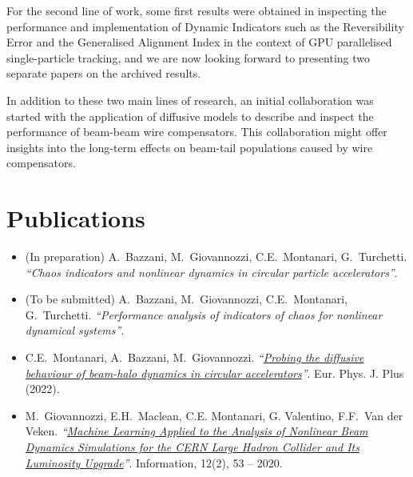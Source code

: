 For the second line of work, some first results were obtained in inspecting
the performance and implementation of Dynamic Indicators such as the
Reversibility Error and the Generalised Alignment Index in the context of GPU
parallelised single-particle tracking, and we are now looking forward to presenting
two separate papers on the archived results.

In addition to these two main lines of research, an initial collaboration was
started with the application of diffusive models to describe and inspect the
performance of beam-beam wire compensators. This collaboration might offer
insights into the long-term effects on beam-tail populations caused by wire
compensators.

\section*{Publications}

\begin{itemize}
    \item (In preparation) A.\ Bazzani, M.\ Giovannozzi, C.E.\ Montanari, G.\ Tur\-chet\-ti. \textit{``Chaos indicators and nonlinear dynamics in circular particle accelerators''}.
    
    \item (To be submitted) A.\ Bazzani, M.\ Giovannozzi, C.E.\ Montanari, G.\ Turchetti. \textit{``Performance analysis of indicators of chaos for nonlinear dynamical systems''}.

    \item  C.E.\ Montanari, A.\ Bazzani, M.\ Giovannozzi. \textit{``\href{https://doi.org/10.1140/epjp/s13360-022-03478-w}{Probing the diffusive behaviour of beam-halo dynamics in circular accelerators}''}. Eur. Phys. J. Plus (2022).

    \item M.\ Giovannozzi, E.H.\ Maclean, C.E. Montanari, G. Valentino, F.F.\ Van der Veken. \textit{``\href{https://doi.org/10.3390/info12020053}{Machine Learning Applied to the Analysis of Nonlinear Beam Dynamics Simulations for the CERN Large Hadron Collider and Its Luminosity Upgrade}''}. Information, 12(2), 53 -- 2020.

\end{itemize}

